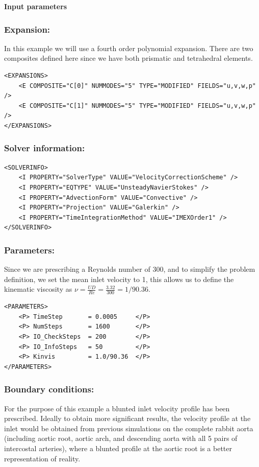 \textbf{Input parameters}

\subsubsection{Expansion:~} In this example we will use a fourth order polynomial expansion. There are two composites defined here since we have both prismatic and tetrahedral elements.
\begin{lstlisting}[style=XMLStyle]
<EXPANSIONS>
	<E COMPOSITE="C[0]" NUMMODES="5" TYPE="MODIFIED" FIELDS="u,v,w,p" />
	<E COMPOSITE="C[1]" NUMMODES="5" TYPE="MODIFIED" FIELDS="u,v,w,p" />
</EXPANSIONS>
\end{lstlisting}

\subsubsection{Solver information:~} 
\begin{lstlisting}[style=XMLStyle]
<SOLVERINFO>
	<I PROPERTY="SolverType" VALUE="VelocityCorrectionScheme" />	
	<I PROPERTY="EQTYPE" VALUE="UnsteadyNavierStokes" />
	<I PROPERTY="AdvectionForm" VALUE="Convective" />
	<I PROPERTY="Projection" VALUE="Galerkin" />
	<I PROPERTY="TimeIntegrationMethod" VALUE="IMEXOrder1" /> 
</SOLVERINFO>
\end{lstlisting}

\subsubsection{Parameters:~} Since we are prescribing a Reynolds number of 300, and to simplify the problem definition, we set the mean inlet velocity to 1, this allows us to define the kinematic viscosity as $\nu = \frac{UD}{Re}=\frac{3.32}{300} = 1/90.36$. 

\begin{lstlisting}[style=XMLStyle]
<PARAMETERS>
	<P> TimeStep       = 0.0005     </P>
	<P> NumSteps       = 1600       </P>
	<P> IO_CheckSteps  = 200        </P>
	<P> IO_InfoSteps   = 50         </P>
	<P> Kinvis         = 1.0/90.36  </P>
</PARAMETERS>
\end{lstlisting}

\subsubsection{Boundary conditions:~} For the purpose of this example a blunted inlet velocity profile has been prescribed. Ideally to obtain more significant results, the velocity profile at the inlet would be obtained from previous simulations on the complete rabbit aorta (including aortic root, aortic arch, and descending aorta with all 5 pairs of intercostal arteries), where a blunted profile at the aortic root is a better representation of reality.

